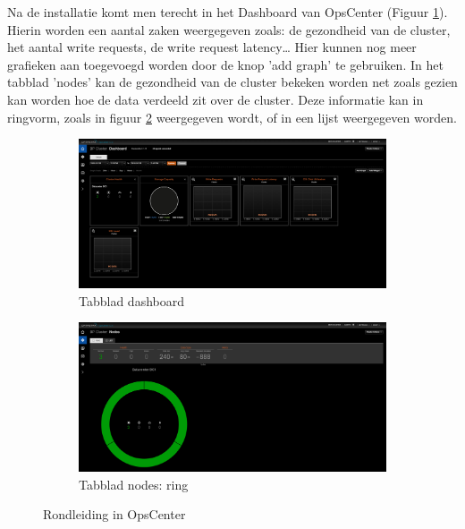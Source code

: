 Na de installatie komt men terecht in het Dashboard van OpsCenter (Figuur \ref{fig:cas_opscenter_tour_dashboard}).
Hierin worden een aantal zaken weergegeven zoals: de gezondheid van de cluster, het aantal write requests, de write request latency\dots
Hier kunnen nog meer grafieken aan toegevoegd worden door de knop 'add graph' te gebruiken.
In het tabblad 'nodes' kan de gezondheid van de cluster bekeken worden net zoals gezien kan worden hoe de data verdeeld zit over de cluster.
Deze informatie kan in ringvorm, zoals in figuur \ref{fig:cas_opscenter_tour_nodes} weergegeven wordt, of in een lijst weergegeven worden.

\begin{figure}[H]
	\centering
	\begin{subfigure}{.49\textwidth}
		\centering
		\includegraphics[width=.99\linewidth]{img/4_installatie_cassandra/2_Tour_1_Dashboard}
		\caption{Tabblad dashboard}
		\label{fig:cas_opscenter_tour_dashboard}
	\end{subfigure}
	\begin{subfigure}{.49\textwidth}
		\centering
		\includegraphics[width=.99\linewidth]{img/4_installatie_cassandra/2_Tour_2_Nodes}
		\caption{Tabblad nodes: ring}
		\label{fig:cas_opscenter_tour_nodes}
	\end{subfigure}
	\caption{Rondleiding in OpsCenter}
	\label{fig:cas_opscenter_tour}
\end{figure}

